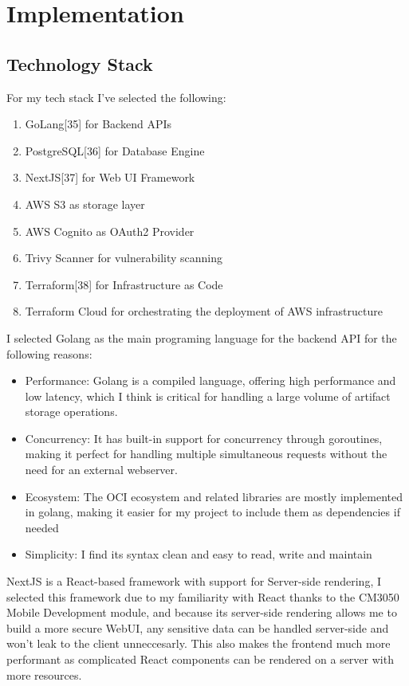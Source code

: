 \documentclass{article}
\begin{document}
  \section{Implementation}

  \subsection{Technology Stack}

  For my tech stack I've selected the following:
  \begin{enumerate}
    \item GoLang[35] for Backend APIs
    \item PostgreSQL[36] for Database Engine
    \item NextJS[37] for Web UI Framework
    \item AWS S3 as storage layer
    \item AWS Cognito as OAuth2 Provider
    \item Trivy Scanner for vulnerability scanning
    \item Terraform[38] for Infrastructure as Code
    \item Terraform Cloud for orchestrating the deployment of AWS infrastructure
  \end{enumerate}

  I selected Golang as the main programing language for the backend API for the following reasons:

  \begin{itemize}
    \item Performance: Golang is a compiled language, offering high performance and low latency, which I think is critical for handling a large volume of artifact storage operations.
    \item Concurrency: It has built-in support for concurrency through goroutines, making it perfect for handling multiple simultaneous requests without the need for an external webserver.
    \item Ecosystem: The OCI ecosystem and related libraries are mostly implemented in golang, making it easier for my project to include them as dependencies if needed
    \item Simplicity: I find its syntax clean and easy to read, write and maintain
  \end{itemize}

  NextJS is a React-based framework with support for Server-side rendering, I selected this framework due to my familiarity with React thanks to the CM3050 Mobile Development module, and because its server-side rendering allows me to build a more secure WebUI, any sensitive data can be handled server-side and won't leak to the client unneccesarly. This also makes the frontend much more performant as complicated React components can be rendered on a server with more resources.
\end{document}
